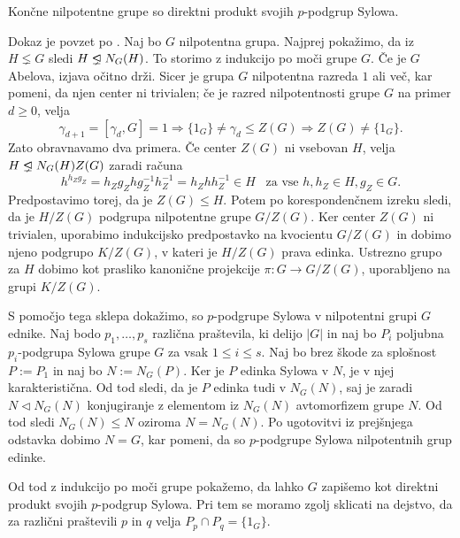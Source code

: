 \begin{trditev}\label{trd_nilpotentne_so_produkti_sylowih}
    Končne nilpotentne grupe so direktni produkt svojih $p$-podgrup Sylowa.
\end{trditev}
\begin{dokaz}
    Dokaz je povzet po \cite{wikipedia2024nilpotent}.
    Naj bo $G$ nilpotentna grupa. Najprej pokažimo, da iz $H \lneq G$ sledi $H \propernormalsubgroup N_G(H)$. To storimo z indukcijo po moči grupe $G$.
    Če je $G$ Abelova, izjava očitno drži. Sicer je grupa $G$ nilpotentna razreda $1$ ali več, kar pomeni, da njen center ni trivialen; če je razred nilpotentnosti grupe $G$ na primer $d \ge 0$, velja \begin{equation*}
        \gamma_{d + 1} = [\gamma_d, G]  = 1 \Longrightarrow  \{ 1_G \} \neq \gamma_d \le Z(G) \Longrightarrow Z(G) \neq \{ 1_G \}.
    \end{equation*} 
     Zato obravnavamo dva primera. Če center $Z(G)$ ni vsebovan $H$, velja $H \propernormalsubgroup N_G(H) Z(G)$ zaradi računa \begin{equation*}
        h^{h_Z g_Z} = h_Z g_Z h g_Z^{-1} h_Z^{-1} = h_Z h h_Z^{-1} \in H \, \, \, \text{ za vse } h, h_Z \in H, g_Z \in G.
    \end{equation*}
    Predpostavimo torej, da je $Z(G) \le H$. Potem po korespondenčnem izreku sledi, da je $H / Z(G)$ podgrupa nilpotentne grupe $G / Z(G)$.
    Ker center $Z(G)$ ni trivialen, uporabimo indukcijsko predpostavko na kvocientu $G / Z(G)$ in dobimo njeno podgrupo $K / Z(G)$, v kateri je $H/ Z(G)$ prava edinka.
    Ustrezno grupo za $H$ dobimo kot prasliko kanonične projekcije $\pi : G \to G / Z(G)$, uporabljeno na grupi $ K / Z(G)$.
    
    S pomočjo tega sklepa dokažimo, so $p$-podgrupe Sylowa v nilpotentni grupi $G$ ednike. Naj bodo $p_1, \ldots , p_s$ različna praštevila, ki delijo $\lvert G \rvert$ in naj bo $P_i$ poljubna $p_i$-podgrupa Sylowa grupe $G$ za vsak $1 \le i \le s$.
    Naj bo brez škode za splošnost $P := P_1$ in naj bo $N := N_G(P)$. Ker je $P$ edinka Sylowa v $N$, je v njej karakteristična. Od tod sledi, da je $P$ edinka tudi v $N_G(N)$, saj je zaradi $N \triangleleft N_G(N)$ konjugiranje z elementom iz $N_G(N)$
    avtomorfizem grupe $N$. Od tod sledi $N_G(N) \le N$ oziroma $N = N_G(N)$. Po ugotovitvi iz prejšnjega odstavka dobimo $N = G$, kar pomeni, da so $p$-podgrupe Sylowa nilpotentnih grup edinke.
    
    Od tod z indukcijo po moči grupe pokažemo, da lahko $G$ zapišemo kot direktni produkt svojih $p$-podgrup Sylowa. Pri tem se moramo zgolj
    sklicati na dejstvo, da za različni praštevili $p$ in $q$ velja $P_p \cap P_q = \{ 1_G \}$.
\end{dokaz}

